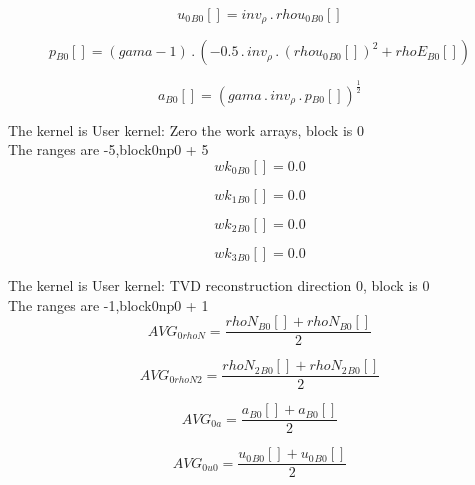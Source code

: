 \documentclass{article}
\begin{document}
\begin{dmath}{u_{0}{_{B0}}}[{}] = inv_{\rho} \,.\, {rhou_{0}{_{B0}}}[{}]\end{dmath}

\begin{dmath}{p{_{B0}}}[{}] = \left(gama - 1\right) \,.\, \left(- 0.5 \,.\, inv_{\rho} \,.\, \left({rhou_{0}{_{B0}}}[{}] \right)^{2} + {rhoE{_{B0}}}[{}]\right)\end{dmath}

\begin{dmath}{a{_{B0}}}[{}] = \left(gama \,.\, inv_{\rho} \,.\, {p{_{B0}}}[{}] \right)^{\frac{1}{2}}\end{dmath}

\noindent The kernel is User kernel: Zero the work arrays, block is 0\\\noindent The ranges are -5,block0np0 + 5\\\begin{dmath}{wk_{0}{_{B0}}}[{}] = 0.0\end{dmath}

\begin{dmath}{wk_{1}{_{B0}}}[{}] = 0.0\end{dmath}

\begin{dmath}{wk_{2}{_{B0}}}[{}] = 0.0\end{dmath}

\begin{dmath}{wk_{3}{_{B0}}}[{}] = 0.0\end{dmath}

\noindent The kernel is User kernel: TVD reconstruction direction 0, block is 0\\\noindent The ranges are -1,block0np0 + 1\\\begin{dmath}AVG_{0 rhoN} = \frac{{rhoN{_{B0}}}[{}] + {rhoN{_{B0}}}[{}]}{2}\end{dmath}

\begin{dmath}AVG_{0 rhoN2} = \frac{{rhoN_{2}{_{B0}}}[{}] + {rhoN_{2}{_{B0}}}[{}]}{2}\end{dmath}

\begin{dmath}AVG_{0 a} = \frac{{a{_{B0}}}[{}] + {a{_{B0}}}[{}]}{2}\end{dmath}

\begin{dmath}AVG_{0 u0} = \frac{{u_{0}{_{B0}}}[{}] + {u_{0}{_{B0}}}[{}]}{2}\end{dmath}
\end{document}
